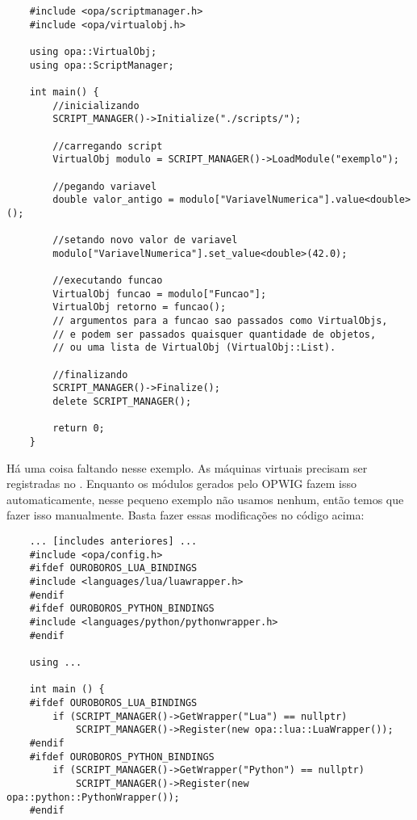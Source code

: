 \begin{enumerate}
    \begin{lstlisting}
    #include <opa/scriptmanager.h>
    #include <opa/virtualobj.h>
    
    using opa::VirtualObj;
    using opa::ScriptManager;
    
    int main() {
        //inicializando
        SCRIPT_MANAGER()->Initialize("./scripts/");
        
        //carregando script
        VirtualObj modulo = SCRIPT_MANAGER()->LoadModule("exemplo");
        
        //pegando variavel
        double valor_antigo = modulo["VariavelNumerica"].value<double>();
        
        //setando novo valor de variavel
        modulo["VariavelNumerica"].set_value<double>(42.0);
        
        //executando funcao
        VirtualObj funcao = modulo["Funcao"];
        VirtualObj retorno = funcao(); 
        // argumentos para a funcao sao passados como VirtualObjs, 
        // e podem ser passados quaisquer quantidade de objetos,
        // ou uma lista de VirtualObj (VirtualObj::List).
        
        //finalizando
        SCRIPT_MANAGER()->Finalize();
        delete SCRIPT_MANAGER();
        
        return 0;
    }
    \end{lstlisting}
    
    Há uma coisa faltando nesse exemplo. As máquinas virtuais precisam ser registradas no \SMgr{}.
    Enquanto os módulos gerados pelo OPWIG fazem isso automaticamente, nesse pequeno exemplo não
    usamos nenhum, então temos que fazer isso manualmente. Basta fazer essas modificações no código acima:
    
    \begin{lstlisting}
    ... [includes anteriores] ...
    #include <opa/config.h>
    #ifdef OUROBOROS_LUA_BINDINGS
    #include <languages/lua/luawrapper.h>
    #endif
    #ifdef OUROBOROS_PYTHON_BINDINGS
    #include <languages/python/pythonwrapper.h>
    #endif
    
    using ...
    
    int main () {
    #ifdef OUROBOROS_LUA_BINDINGS
        if (SCRIPT_MANAGER()->GetWrapper("Lua") == nullptr)
            SCRIPT_MANAGER()->Register(new opa::lua::LuaWrapper());    
    #endif
    #ifdef OUROBOROS_PYTHON_BINDINGS
        if (SCRIPT_MANAGER()->GetWrapper("Python") == nullptr)
            SCRIPT_MANAGER()->Register(new opa::python::PythonWrapper());
    #endif
    

\end{lstlisting}
\end{enumerate}
